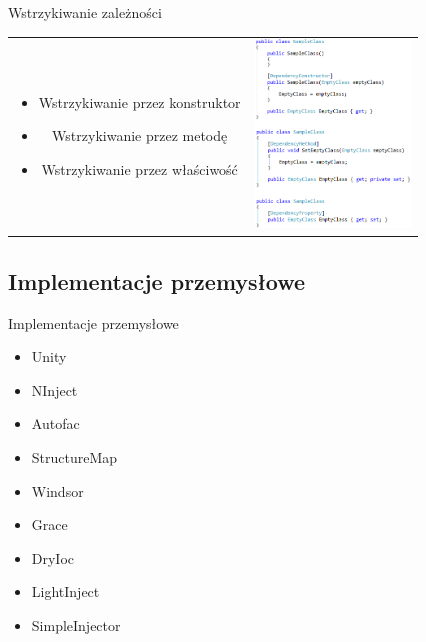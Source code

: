 \documentclass{beamer}
\begin{document}
\begin{frame}{Wstrzykiwanie zależności}
\begin{table}
     \begin{small}
	\begin{tabular}{ c p{3cm} }
	
	\begin{minipage}{.6\textwidth}
\begin{itemize}
	\item Wstrzykiwanie przez konstruktor
	\item Wstrzykiwanie przez metodę
	\item Wstrzykiwanie przez właściwość
\end{itemize}
   	 \end{minipage}
   	 &   	 
	\begin{minipage}{.4\textwidth}	
  		\includegraphics[height=5cm]{PresentationDependency.png}
   	 \end{minipage}

	\end{tabular}
     \end{small}
\end{table}
\end{frame}

\subsection*{Implementacje przemysłowe}

\begin{frame}{Implementacje przemysłowe}
\begin{itemize}
	\item Unity
	\item NInject
	\item Autofac
	\item StructureMap
	\item Windsor
	\item Grace
	\item DryIoc
	\item LightInject
	\item SimpleInjector
\end{itemize}
\end{frame}
\end{document}
